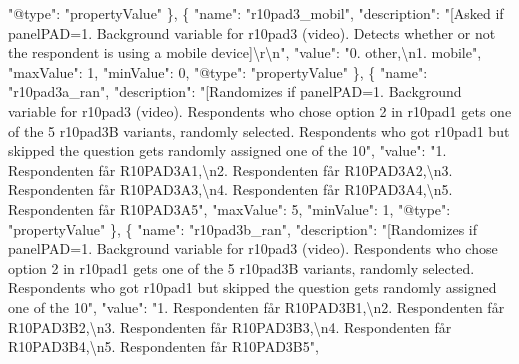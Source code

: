 \documentclass[
]{book}
\newenvironment{Shaded}{\begin{snugshade}}{\end{snugshade}}
\newcommand{\CharTok}[1]{\textcolor[rgb]{0.31,0.60,0.02}{#1}}
\newcommand{\DataTypeTok}[1]{\textcolor[rgb]{0.13,0.29,0.53}{#1}}
\newcommand{\DecValTok}[1]{\textcolor[rgb]{0.00,0.00,0.81}{#1}}
\newcommand{\FunctionTok}[1]{\textcolor[rgb]{0.00,0.00,0.00}{#1}}
\newcommand{\OtherTok}[1]{\textcolor[rgb]{0.56,0.35,0.01}{#1}}
\newcommand{\StringTok}[1]{\textcolor[rgb]{0.31,0.60,0.02}{#1}}
\begin{document}
\begin{Shaded}
\begin{Highlighting}[]
      \DataTypeTok{"@type"}\FunctionTok{:} \StringTok{"propertyValue"}
    \FunctionTok{\}}\OtherTok{,}
    \FunctionTok{\{}
      \DataTypeTok{"name"}\FunctionTok{:} \StringTok{"r10pad3_mobil"}\FunctionTok{,}
      \DataTypeTok{"description"}\FunctionTok{:} \StringTok{"[Asked if panelPAD=1. Background variable for r10pad3 (video). Detects whether or not the respondent is using a mobile device]}\CharTok{\textbackslash{}r\textbackslash{}n}\StringTok{"}\FunctionTok{,}
      \DataTypeTok{"value"}\FunctionTok{:} \StringTok{"0. other,}\CharTok{\textbackslash{}n}\StringTok{1. mobile"}\FunctionTok{,}
      \DataTypeTok{"maxValue"}\FunctionTok{:} \DecValTok{1}\FunctionTok{,}
      \DataTypeTok{"minValue"}\FunctionTok{:} \DecValTok{0}\FunctionTok{,}
      \DataTypeTok{"@type"}\FunctionTok{:} \StringTok{"propertyValue"}
    \FunctionTok{\}}\OtherTok{,}
    \FunctionTok{\{}
      \DataTypeTok{"name"}\FunctionTok{:} \StringTok{"r10pad3a_ran"}\FunctionTok{,}
      \DataTypeTok{"description"}\FunctionTok{:} \StringTok{"[Randomizes if panelPAD=1. Background variable for r10pad3 (video). Respondents who chose option 2 in r10pad1 gets one of the 5 r10pad3B variants, randomly selected. Respondents who got r10pad1 but skipped the question gets randomly assigned one of the 10"}\FunctionTok{,}
      \DataTypeTok{"value"}\FunctionTok{:} \StringTok{"1. Respondenten får R10PAD3A1,}\CharTok{\textbackslash{}n}\StringTok{2. Respondenten får R10PAD3A2,}\CharTok{\textbackslash{}n}\StringTok{3. Respondenten får R10PAD3A3,}\CharTok{\textbackslash{}n}\StringTok{4. Respondenten får R10PAD3A4,}\CharTok{\textbackslash{}n}\StringTok{5. Respondenten får R10PAD3A5"}\FunctionTok{,}
      \DataTypeTok{"maxValue"}\FunctionTok{:} \DecValTok{5}\FunctionTok{,}
      \DataTypeTok{"minValue"}\FunctionTok{:} \DecValTok{1}\FunctionTok{,}
      \DataTypeTok{"@type"}\FunctionTok{:} \StringTok{"propertyValue"}
    \FunctionTok{\}}\OtherTok{,}
    \FunctionTok{\{}
      \DataTypeTok{"name"}\FunctionTok{:} \StringTok{"r10pad3b_ran"}\FunctionTok{,}
      \DataTypeTok{"description"}\FunctionTok{:} \StringTok{"[Randomizes if panelPAD=1. Background variable for r10pad3 (video). Respondents who chose option 2 in r10pad1 gets one of the 5 r10pad3B variants, randomly selected. Respondents who got r10pad1 but skipped the question gets randomly assigned one of the 10"}\FunctionTok{,}
      \DataTypeTok{"value"}\FunctionTok{:} \StringTok{"1. Respondenten får R10PAD3B1,}\CharTok{\textbackslash{}n}\StringTok{2. Respondenten får R10PAD3B2,}\CharTok{\textbackslash{}n}\StringTok{3. Respondenten får R10PAD3B3,}\CharTok{\textbackslash{}n}\StringTok{4. Respondenten får R10PAD3B4,}\CharTok{\textbackslash{}n}\StringTok{5. Respondenten får R10PAD3B5"}\FunctionTok{,}

\end{Highlighting}
\end{Shaded}
\end{document}
